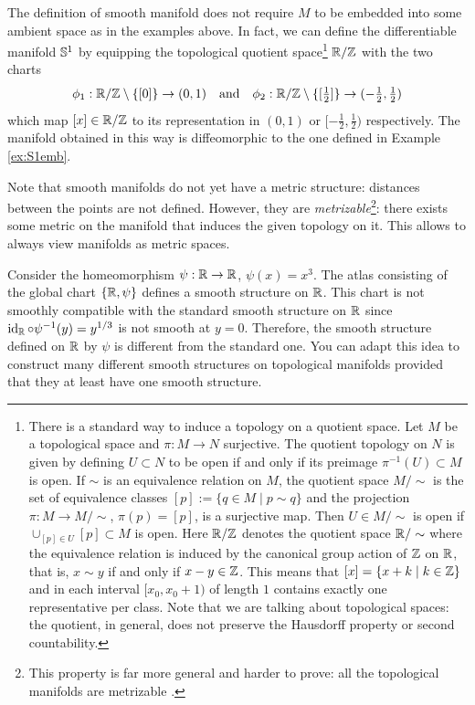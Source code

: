 \begin{example}
  The definition of smooth manifold does not require $M$ to be embedded into some ambient space as in the examples above.
  In fact, we can define the differentiable manifold $\mathbb{S}^1$ by equipping the topological quotient space\footnote{
    There is a standard way to induce a topology on a quotient space.
    Let $M$ be a topological space and $\pi:M\to N$ surjective.
    The quotient topology on $N$ is given by defining $U\subset N$ to be open if and only if its preimage $\pi^{-1}(U)\subset M$ is open.
    If $\sim$ is an equivalence relation on $M$, the quotient space $M/\sim$ is the set of equivalence classes $[p]:=\{q\in M \mid p\sim q\}$ and the projection $\pi: M\to M/\sim$, $\pi(p) = [p]$, is a surjective map. Then $U\in M/\sim$ is open if $\cup_{[p]\in U} [p] \subset M$ is open.
    Here $\mathbb{R}/\mathbb{Z}$ denotes the quotient space $\mathbb{R}/\sim$ where the equivalence relation is induced by the canonical group action of $\mathbb{Z}$ on $\mathbb{R}$, that is, $x\sim y$ if and only if $x-y\in\mathbb{Z}$.
    This means that $[x] = \{x+k \mid k\in\mathbb{Z}\}$ and in each interval $[x_0, x_0+1)$ of length $1$ contains exactly one representative per class.
    Note that we are talking about topological spaces: the quotient, in general, does not preserve the Hausdorff property or second countability.} $\mathbb{R}/\mathbb{Z}$ with the two charts
  \begin{equation}\textstyle
    \phi_1 : \mathbb{R}/\mathbb{Z} \setminus\{[0]\} \to (0,1)
    \quad\mbox{and}\quad
    \phi_2 : \mathbb{R}/\mathbb{Z} \setminus\{[\frac12]\} \to (-\frac12,\frac12)
  \end{equation}
  which map $[x]\in\mathbb{R}/\mathbb{Z}$ to its representation in $(0,1)$ or $[-\frac12, \frac12)$ respectively.
  The manifold obtained in this way is diffeomorphic to the one defined in Example \ref{ex:S1emb}.
\end{example}

Note that smooth manifolds do not yet have a metric structure: distances between the points are not defined.
However, they are \emph{metrizable}\footnote{This property is far more general and harder to prove: all the topological manifolds are metrizable \cite{book:munkres:topology}.}: there exists some metric on the manifold that induces the given topology on it.
This allows to always view manifolds as metric spaces.

\begin{example}
  Consider the homeomorphism $\psi:\mathbb{R}\to\mathbb{R}$, $\psi(x) = x^3$.
  The atlas consisting of the global chart $\{\mathbb{R}, \psi\}$ defines a smooth structure on $\mathbb{R}$.
  This chart is not smoothly compatible with the standard smooth structure on $\mathbb{R}$ since $\operatorname{id}_{\mathbb{R}} \circ \psi^{-1} (y) = y^{1/3}$ is not smooth at $y=0$.
  Therefore, the smooth structure defined on $\mathbb{R}$ by $\psi$ is different from the standard one.
  You can adapt this idea to construct many different smooth structures on topological manifolds provided that they at least have one smooth structure.
\end{example}

